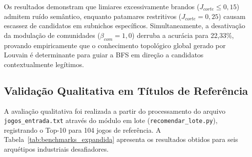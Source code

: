 \documentclass[conference]{IEEEtran}
\begin{document}
\begin{table}[htbp]
\caption{Sensibilidade ao Corte Semântico de Jaccard e Bônus de Louvain}
\centering
{}
\label{tab:sensibilidade_jaccard}
\end{table}

Os resultados demonstram que limiares excessivamente brandos ($J_{corte} \le 0{,}15$) admitem ruído semântico, enquanto patamares restritivos ($J_{corte} = 0{,}25$) causam escassez de candidatos em subnichos específicos. Simultaneamente, a desativação da modulação de comunidades ($\beta_{com} = 1{,}0$) derruba a acurácia para 22,33\%, provando empiricamente que o conhecimento topológico global gerado por Louvain é determinante para guiar a BFS em direção a candidatos contextualmente legítimos.

\subsection{Validação Qualitativa em Títulos de Referência}
A avaliação qualitativa foi realizada a partir do processamento do arquivo \texttt{jogos\_entrada.txt} através do módulo em lote (\texttt{recomendar\_lote.py}), registrando o Top-10 para 104 jogos de referência. A Tabela~\ref{tab:benchmarks_expandida} apresenta os resultados obtidos para seis arquétipos industriais desafiadores.
\end{document}
